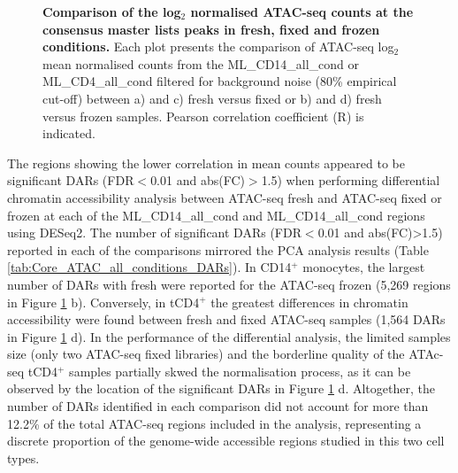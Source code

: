 \begin{figure}[H]
\begin{subfigure}[b]{0.45\textwidth}
\end{subfigure}
\caption[Comparison of the log$_2$ normalised ATAC-seq counts at the consensus master lists peaks in fresh, fixed and frozen conditions.]{\textbf{Comparison of the log$_2$ normalised ATAC-seq counts at the consensus master lists peaks in fresh, fixed and frozen conditions.} Each plot presents the comparison of ATAC-seq log$_2$ mean normalised counts from the ML\_CD14\_all\_cond or ML\_CD4\_all\_cond filtered for background noise (80\% empirical cut-off) between a) and c) fresh versus fixed or b) and d) fresh versus frozen samples. Pearson correlation coefficient (R) is indicated.}
\label{figure:Core_ATAC_all-conditions_correlation}
\end{figure}
	
	
The regions showing the lower correlation in mean counts appeared to be significant DARs (FDR$<$0.01 and abs(FC)$>$1.5) when performing differential chromatin accessibility analysis between ATAC-seq fresh and ATAC-seq fixed or frozen at each of the ML\_CD14\_all\_cond and ML\_CD14\_all\_cond regions using DESeq2. The number of significant DARs (FDR$<$0.01 and abs(FC)>1.5) reported in each of the comparisons mirrored the PCA analysis results (Table \ref{tab:Core_ATAC_all_conditions_DARs}). In CD14$^+$ monocytes, the largest number of DARs with fresh were reported for the ATAC-seq frozen (5,269 regions in Figure \ref{figure:Core_ATAC_all-conditions_correlation} b). Conversely, in tCD4$^+$ the greatest differences in chromatin accessibility were found between fresh and fixed ATAC-seq samples (1,564 DARs in Figure \ref{figure:Core_ATAC_all-conditions_correlation} d). In the performance of the differential analysis, the limited samples size (only two ATAC-seq fixed libraries) and the borderline quality of the ATAc-seq tCD4$^+$ samples partially skwed the normalisation process, as it can be observed by the location of the significant DARs in Figure \ref{figure:Core_ATAC_all-conditions_correlation} d. Altogether, the number of DARs identified in each comparison did not account for more than 12.2\% of the total ATAC-seq regions included in the analysis, representing a discrete proportion of the genome-wide accessible regions studied in this two cell types.  


	
